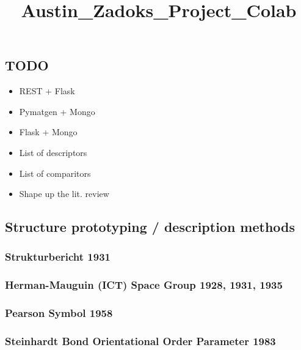 \documentclass[11pt]{article}
\title{Austin\_Zadoks\_Project\_Colab}
\providecommand{\tightlist}{%
      \setlength{\itemsep}{0pt}\setlength{\parskip}{0pt}}
\begin{document}
    
    
    \maketitle
    
    

    
    \subsection{TODO}\label{todo}

\begin{itemize}
\tightlist
\item
  REST + Flask
\item
  Pymatgen + Mongo
\item
  Flask + Mongo
\item
  List of descriptors
\item
  List of comparitors
\item
  Shape up the lit. review
\end{itemize}

    \subsection{Structure prototyping / description
methods}\label{structure-prototyping-description-methods}

    \subsubsection{Strukturbericht 1931}\label{strukturbericht-1931}

    \subsubsection{Herman-Mauguin (ICT) Space Group 1928, 1931,
1935}\label{herman-mauguin-ict-space-group-1928-1931-1935}

    \subsubsection{Pearson Symbol 1958}\label{pearson-symbol-1958}

    \subsubsection{Steinhardt Bond Orientational Order Parameter
1983}\label{steinhardt-bond-orientational-order-parameter-1983}
\end{document}

